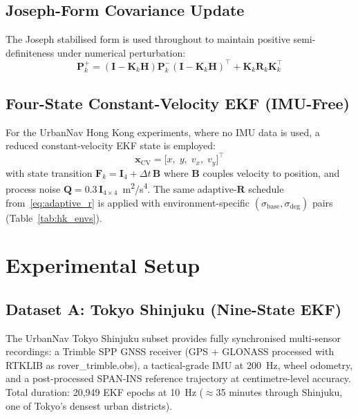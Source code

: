 \documentclass[journal]{IEEEtran}
\newcommand{\Rmat}{\mathbf{R}}
\newcommand{\Pmat}{\mathbf{P}}
\newcommand{\Kmat}{\mathbf{K}}
\newcommand{\Hmat}{\mathbf{H}}
\newcommand{\xvec}{\mathbf{x}}
\newcommand{\sigbase}{\sigma_{\mathrm{base}}}
\newcommand{\sigdeg}{\sigma_{\mathrm{deg}}}
\begin{document}
\subsection{Joseph-Form Covariance Update}

The Joseph stabilised form is used throughout to maintain positive
semi-definiteness under numerical perturbation:
\begin{equation}
  \Pmat_k^+ = (\mathbf{I} - \Kmat_k\Hmat)\Pmat_k^-
    (\mathbf{I} - \Kmat_k\Hmat)^\top
    + \Kmat_k\Rmat_k\Kmat_k^\top
\end{equation}

\subsection{Four-State Constant-Velocity EKF (IMU-Free)}
\label{subsec:cv_ekf}

For the UrbanNav Hong Kong experiments, where no IMU data is used, a
reduced constant-velocity EKF state is employed:
\begin{equation}
  \xvec_\text{CV} = \bigl[x,\; y,\; v_x,\; v_y\bigr]^\top
\end{equation}
with state transition $\mathbf{F}_k = \mathbf{I}_4 + \Delta t\,\mathbf{B}$
where $\mathbf{B}$ couples velocity to position, and process noise
$\mathbf{Q} = 0.3\,\mathbf{I}_{4\times4}$~m\textsuperscript{2}/s\textsuperscript{4}.
The same adaptive-$\Rmat$ schedule from~\eqref{eq:adaptive_r} is applied with
environment-specific $(\sigbase, \sigdeg)$ pairs (Table~\ref{tab:hk_envs}).

\section{Experimental Setup}

\subsection{Dataset A: Tokyo Shinjuku (Nine-State EKF)}
\label{subsec:tokyo_setup}

The UrbanNav Tokyo Shinjuku subset provides fully synchronised multi-sensor
recordings: a Trimble SPP GNSS receiver (GPS + GLONASS processed with RTKLIB
as rover\_trimble.obs), a tactical-grade IMU at 200~Hz, wheel odometry, and a
post-processed SPAN-INS reference trajectory at centimetre-level accuracy.
Total duration: 20,949 EKF epochs at 10~Hz (${\approx}$35 minutes through
Shinjuku, one of Tokyo's densest urban districts).
\end{document}
